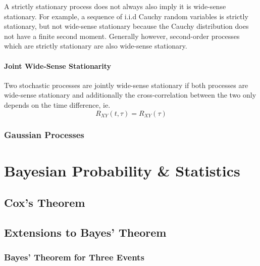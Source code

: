 \documentclass[11pt]{report} %
\begin{document}
A strictly stationary process does not always also imply it is wide-sense stationary. For example, a sequence of i.i.d Cauchy random variables is strictly stationary, but not wide-sense stationary because the Cauchy distribution does not have a finite second moment. Generally however, second-order processes which are strictly stationary are also wide-sense stationary.

\subsubsection{Joint Wide-Sense Stationarity}

Two stochastic processes are jointly wide-sense stationary if both processes are wide-sense stationary and additionally the cross-correlation between the two only depends on the time difference, ie.
\begin{equation}
R_{XY}\left(t, \tau\right) = R_{XY}\left(\tau\right)
\end{equation}

\subsection{Gaussian Processes}

\chapter{Bayesian Probability \& Statistics}

\section{Cox's Theorem}

\section{Extensions to Bayes' Theorem}

\subsection{Bayes' Theorem for Three Events}
\end{document}
